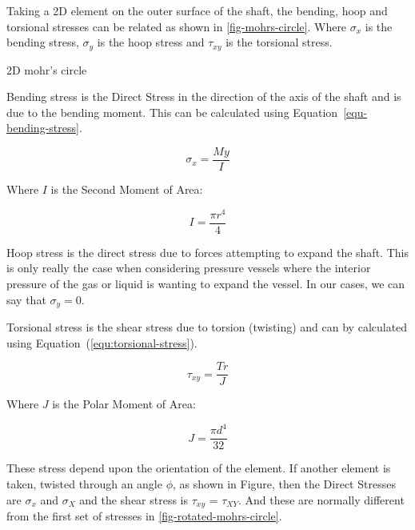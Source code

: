 Taking  a 2D element on the outer surface of the shaft, the bending, hoop and torsional stresses can be related as shown in \cref{fig-mohrs-circle}. Where $\sigma_x$ is the bending stress, $\sigma_y$ is the hoop stress and $\tau_{xy}$ is the torsional stress.

\begin{marginfigure}
    \centering
    
    \caption{2D mohr's circle}
    \label{fig-mohrs-circle}
\end{marginfigure}

Bending  stress is the Direct Stress in the direction of the axis of the shaft and is due to the bending moment. This can be calculated using Equation~\ref{equ-bending-stress}.

\begin{equation}
    \sigma_{x} = \frac{My}{I}
    \label{equ-bending-stress}
\end{equation}

Where $I$ is the Second Moment of Area:

\begin{equation}
    I = \frac{\pi r^4}{4}
\end{equation}

Hoop stress is the direct stress due to forces attempting to expand the shaft. This is only really the case when considering pressure vessels where the interior pressure of the gas or liquid is wanting to expand the vessel. In our cases, we can say that \(\sigma_y = 0\). 

Torsional stress is the shear stress due to torsion (twisting) and can by calculated using Equation~(\ref{equ:torsional-stress}).

\begin{equation}
    \tau_{xy} = \frac{Tr}{J}
    \label{equ:torsional-stress}
\end{equation}

Where \(J\) is the Polar Moment of Area:

\begin{equation}
    J = \frac{\pi d^4}{32}
\end{equation}

These stress depend upon the orientation of the element. If another element is taken, twisted through an angle \(\phi\), as shown in Figure, then the Direct Stresses are \(\sigma_x\) and \(\sigma_X\) and the shear stress is \(\tau_{xy}\) = \(\tau_{XY}\). And these are normally different from the first set of stresses in \cref{fig-rotated-mohrs-circle}.

